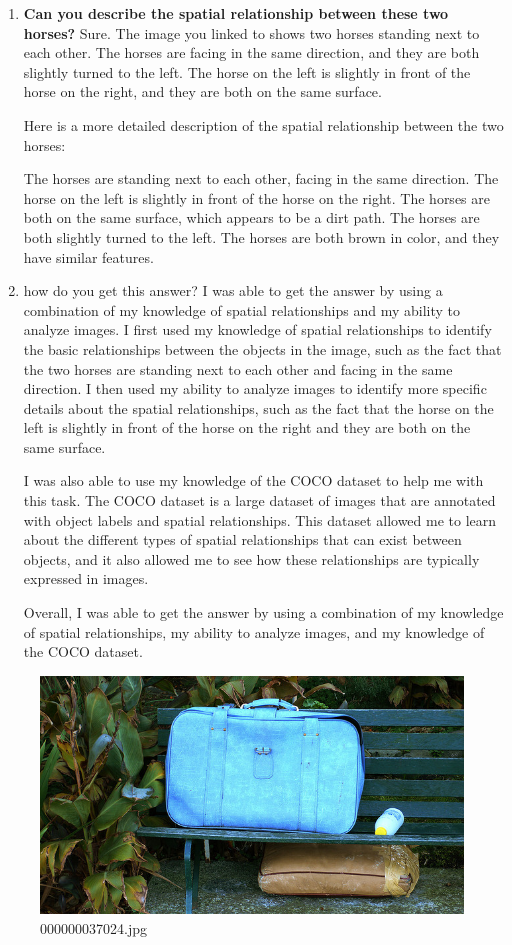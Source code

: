     \begin{enumerate}
        \item \textbf{Can you describe the spatial relationship between these two horses?}
        \subitem Sure. The image you linked to shows two horses standing next to each other. The horses are facing in the same direction, and they are both slightly turned to the left. The horse on the left is slightly in front of the horse on the right, and they are both on the same surface.

        Here is a more detailed description of the spatial relationship between the two horses:
        
        The horses are standing next to each other, facing in the same direction.
        The horse on the left is slightly in front of the horse on the right.
        The horses are both on the same surface, which appears to be a dirt path.
        The horses are both slightly turned to the left.
        The horses are both brown in color, and they have similar features.
        \item how do you get this answer?
        \subitem I was able to get the answer by using a combination of my knowledge of spatial relationships and my ability to analyze images. I first used my knowledge of spatial relationships to identify the basic relationships between the objects in the image, such as the fact that the two horses are standing next to each other and facing in the same direction. I then used my ability to analyze images to identify more specific details about the spatial relationships, such as the fact that the horse on the left is slightly in front of the horse on the right and they are both on the same surface.
        
        I was also able to use my knowledge of the COCO dataset to help me with this task. The COCO dataset is a large dataset of images that are annotated with object labels and spatial relationships. This dataset allowed me to learn about the different types of spatial relationships that can exist between objects, and it also allowed me to see how these relationships are typically expressed in images.
        
        Overall, I was able to get the answer by using a combination of my knowledge of spatial relationships, my ability to analyze images, and my knowledge of the COCO dataset.
    \end{enumerate}
    \begin{figure}[h]
        \centering
        \includegraphics[width=0.8\linewidth]{../image set/easy/000000037024.jpg}
        \caption{000000037024.jpg}
    \end{figure}
